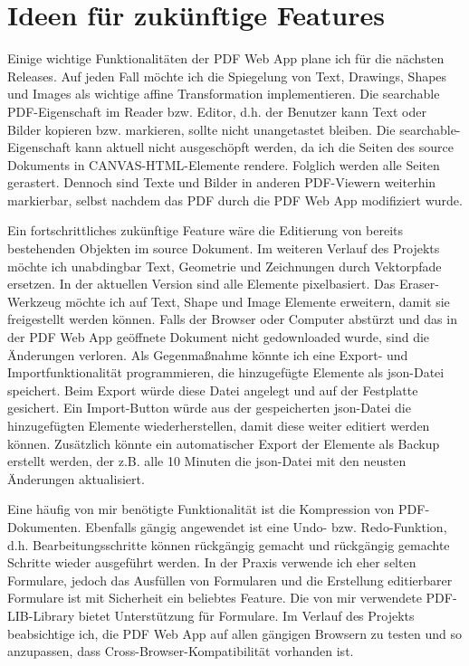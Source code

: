 \section{Ideen für zukünftige Features}
Einige wichtige Funktionalitäten der PDF Web App plane ich für die nächsten Releases. Auf jeden Fall möchte ich die Spiegelung von Text, Drawings, Shapes und Images als wichtige affine Transformation implementieren. Die searchable PDF-Eigenschaft im Reader bzw. Editor, d.h. der Benutzer kann Text oder Bilder kopieren bzw. markieren, sollte nicht unangetastet bleiben. Die searchable-Eigenschaft kann aktuell nicht ausgeschöpft werden, da ich die Seiten des source Dokuments in CANVAS-HTML-Elemente rendere. Folglich werden alle Seiten gerastert. Dennoch sind Texte und Bilder in anderen PDF-Viewern weiterhin markierbar, selbst nachdem das PDF durch die PDF Web App modifiziert wurde.
\par
Ein fortschrittliches zukünftige Feature wäre die Editierung von bereits bestehenden Objekten im source Dokument. Im weiteren Verlauf des Projekts möchte ich unabdingbar Text, Geometrie und Zeichnungen durch Vektorpfade ersetzen. In der aktuellen Version sind alle Elemente pixelbasiert. Das Eraser-Werkzeug möchte ich auf Text, Shape und Image Elemente erweitern, damit sie freigestellt werden können. Falls der Browser oder Computer abstürzt und das in der PDF Web App geöffnete Dokument nicht gedownloaded wurde, sind die Änderungen verloren. Als Gegenmaßnahme könnte ich eine Export- und Importfunktionalität programmieren, die hinzugefügte Elemente als \gls{json}-Datei speichert. Beim Export würde diese Datei angelegt und auf der Festplatte gesichert. Ein Import-Button würde aus der gespeicherten \gls{json}-Datei die hinzugefügten Elemente wiederherstellen, damit diese weiter editiert werden können. Zusätzlich könnte ein automatischer Export der Elemente als Backup erstellt werden, der z.B. alle 10 Minuten die \gls{json}-Datei mit den neusten Änderungen aktualisiert.
\par
Eine häufig von mir benötigte Funktionalität ist die Kompression von PDF-Dokumenten. Ebenfalls gängig angewendet ist eine Undo- bzw. Redo-Funktion, d.h. Bearbeitungsschritte können rückgängig gemacht und rückgängig gemachte Schritte wieder ausgeführt werden. In der Praxis verwende ich eher selten Formulare, jedoch das Ausfüllen von Formularen und die Erstellung editierbarer Formulare ist mit Sicherheit ein beliebtes Feature. Die von mir verwendete PDF-LIB-Library bietet Unterstützung für Formulare. Im Verlauf des Projekts beabsichtige ich, die PDF Web App auf allen gängigen Browsern zu testen und so anzupassen, dass Cross-Browser-Kompatibilität vorhanden ist.